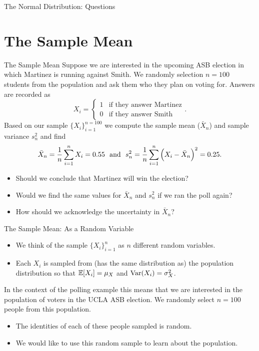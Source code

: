 \documentclass[notheorems,9pt]{beamer}
\begin{document}
\begin{frame}{The Normal Distribution: Questions} 
	\label{frame:nd-questions}
	\centering
	{\Large
	}
\end{frame}
\section{The Sample Mean}
\begin{frame}{The Sample Mean} 
	\label{frame:sm-intro}
	 Suppose we are interested in the upcoming ASB election in which Martinez is running against Smith. We randomly selection \(n=100\) students from the population and ask them who they plan on voting for. Answers are recorded as 
	\[
	    X_i = \begin{cases}
	    	1 & \text{if they answer Martinez} \\
			0 & \text{if they answer Smith}
	    \end{cases}
	.\] 
	Based on our sample \(\{X_i\}_{i=1}^{n=100}\) we compute the sample mean (\(\bar X_n\)) and sample variance \(s_n^2\) and find 
	\[
	    \bar X_n = \frac{1}{n}\sum_{i=1}^n X_i = 0.55 \hbox{ }\text{ and }\hbox{ } s_n^2 = \frac{1}{n}\sum_{i=1}^n \left(X_i-\bar X_n\right)^2 = 0.25
	.\] 
	\onslide<2->
	\begin{itemize}
		\item<2-> Should we conclude that Martinez will win the election?
		\item<3-> Would we find the same values for \(\bar X_n\) and \(s_n^2\) if we ran the poll again?
		\item<4-> How should we acknowledge the uncertainty in \(\bar X_n\)?
	\end{itemize}
\end{frame}
\begin{frame}{The Sample Mean: As a Random Variable} 
	\begin{center}
	\end{center}
	\begin{itemize}
		\item We think of the sample \(\{X_i\}_{i=1}^n\) as \(n\) different random variables.
		\item Each \(X_i\) is sampled from (has the same distribution as) the population distribution so that \(\mathbb{E}[X_i]=\mu_X\) and \(\operatorname{Var}(X_i)=\sigma_X^2\).
	\end{itemize}
	In the context of the polling example this means that we are interested in the population of voters in the UCLA ASB election. We randomly select \(n=100\) people from this population.
	\begin{itemize}
		\item The identities of each of these people sampled is random.
		\item We would like to use this random sample to learn about the population.
	\end{itemize}
\end{frame}
\end{document}
